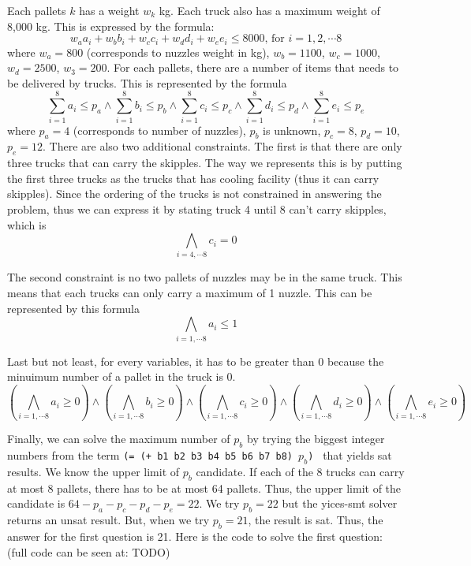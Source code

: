\documentclass[12pt]{article}
\begin{document}
Each pallets $k$ has a weight $w_k$ kg. Each truck also has a maximum weight of 8,000 kg. This is expressed by the formula:
\[w_a a_i + w_b b_i + w_c c_i + w_d d_i + w_e e_i \leq 8000  \text{, for }  i=1,2,\cdots 8 \]
where $w_a=800$ (corresponds to nuzzles weight in kg), $w_b=1100$, $w_c=1000$, $w_d=2500$, $w_3=200$. For each pallets, there are a number of items that needs to be delivered by trucks. This is represented by the formula
\[ \sum_{i=1}^{8}{a_i} \leq p_a \wedge
 \sum_{i=1}^{8}{b_i} \leq p_b \wedge 
 \sum_{i=1}^{8}{c_i} \leq p_c \wedge
 \sum_{i=1}^{8}{d_i} \leq p_d \wedge
 \sum_{i=1}^{8}{e_i} \leq p_e\]
 where $p_a=4$ (corresponds to number of nuzzles), $p_b$ is unknown, $p_c=8$, $p_d=10$, $p_e=12$. There are also two additional constraints. The first is that there are only three trucks that can carry the skipples. The way we represents this is by putting the first three trucks as the trucks that has cooling facility (thus it can carry skipples). Since the ordering of the trucks is not constrained in answering the problem, thus we can express it by stating truck 4 until 8 can't carry skipples, which is 
 \[ \bigwedge_{i=4,\cdots 8} c_i=0\]
 
 The second constraint is no two pallets of nuzzles may be in the same truck. This means that each trucks can only carry a maximum of 1 nuzzle. This can be represented by this formula
 \[ \bigwedge_{i=1,\cdots 8} a_i\leq1\]
 
 Last but not least, for every variables, it has to be greater than 0 because the minuimum number of a pallet in the truck is 0.
 \[ (\bigwedge_{i=1,\cdots 8} a_i\geq0) \wedge (\bigwedge_{i=1,\cdots 8} b_i\geq0) \wedge (\bigwedge_{i=1,\cdots 8} c_i\geq0) \wedge  (\bigwedge_{i=1,\cdots 8} d_i\geq0) \wedge (\bigwedge_{i=1,\cdots 8} e_i\geq0)\]
 
 Finally, we can solve the maximum number of $p_b$ by trying the biggest integer numbers from the term {\tt (= (+ b1 b2 b3 b4 b5 b6 b7 b8) $p_b$) } that yields sat results. We know the upper limit of $p_b$ candidate. If each of the 8 trucks can carry at most 8 pallets, there has to be at most 64 pallets. Thus, the upper limit of the candidate is $64-p_a-p_c-p_d-p_e=22$. We try $p_b=22$ but the yices-smt solver returns an unsat result. But, when we try $p_b=21$, the result is sat. Thus, the answer for the first question is 21. Here is the code to solve the first question: (full code can be seen at: TODO)
 
\end{document}
